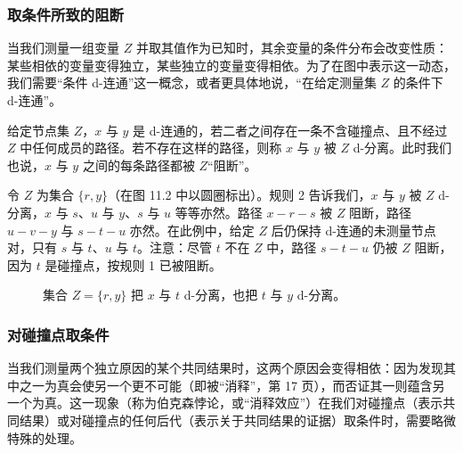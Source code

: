 \subsubsection*{取条件所致的阻断}

当我们测量一组变量 $Z$ 并取其值作为已知时，其余变量的条件分布会改变性质：某些相依的变量变得独立，某些独立的变量变得相依。为了在图中表示这一动态，我们需要“条件 d-连通”这一概念，或者更具体地说，“在给定测量集 $Z$ 的条件下 d-连通”。

给定节点集 $Z$，$x$ 与 $y$ 是 d-连通的，若二者之间存在一条不含碰撞点、且不经过 $Z$ 中任何成员的路径。若不存在这样的路径，则称 $x$ 与 $y$ 被 $Z$ d-分离。此时我们也说，$x$ 与 $y$ 之间的每条路径都被 $Z$“阻断”。

\begin{example}\label{ex:11.1.2}
令 $Z$ 为集合 $\{r,y\}$（在图 11.2 中以圆圈标出）。规则 2 告诉我们，$x$ 与 $y$ 被 $Z$ d-分离，$x$ 与 $s$、$u$ 与 $y$、$s$ 与 $u$ 等等亦然。路径 $x-r-s$ 被 $Z$ 阻断，路径 $u-v-y$ 与 $s-t-u$ 亦然。在此例中，给定 $Z$ 后仍保持 d-连通的未测量节点对，只有 $s$ 与 $t$、$u$ 与 $t$。注意：尽管 $t$ 不在 $Z$ 中，路径 $s-t-u$ 仍被 $Z$ 阻断，因为 $t$ 是碰撞点，按规则 1 已被阻断。
\end{example}

\begin{figure}[htbp]
\centering
{}
\caption{集合 $Z=\{r,y\}$ 把 $x$ 与 $t$ d-分离，也把 $t$ 与 $y$ d-分离。}
\label{fig:11.2}
\end{figure}

\subsubsection*{对碰撞点取条件}

当我们测量两个独立原因的某个共同结果时，这两个原因会变得相依：因为发现其中之一为真会使另一个更不可能（即被“消释”，第 17 页），而否证其一则蕴含另一个为真。这一现象（称为伯克森悖论，或“消释效应”）在我们对碰撞点（表示共同结果）或对碰撞点的任何后代（表示关于共同结果的证据）取条件时，需要略微特殊的处理。

